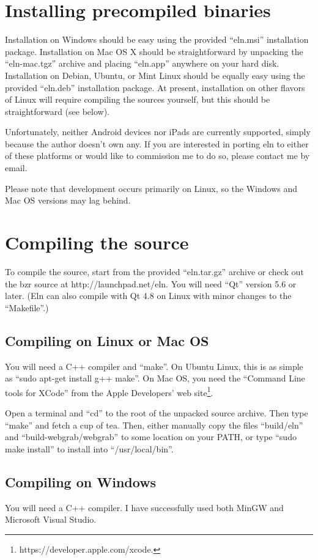 \documentclass[11pt]{report}
\begin{document}
\section{Installing precompiled binaries}

Installation on Windows should be easy using the provided ``eln.msi''
installation package. Installation on Mac OS X should be
straightforward by unpacking the ``eln-mac.tgz'' archive and placing
``eln.app'' anywhere on your hard disk.  Installation on Debian,
Ubuntu, or Mint Linux should be equally easy using the provided
``eln.deb'' installation package. At present, installation on other
flavors of Linux will require compiling the sources yourself, but this
should be straightforward (see below).

Unfortunately, neither Android devices nor iPads are currently
supported, simply because the author doesn't own any. If you are
interested in porting eln to either of these platforms or would like
to commission me to do so, please contact me by email.

Please note that development occurs
primarily on Linux, so the Windows and Mac OS versions may lag
behind.

\section{Compiling the source}
To compile the source,  start from the provided
``eln.tar.gz'' archive or check out the bzr source at http://launchpad.net/eln. You will need
``Qt'' version 5.6 or later. (Eln can also compile with Qt 4.8 on
Linux with minor changes to the ``Makefile''.)

\subsection{Compiling on Linux or Mac OS}

You will need a C++ compiler and ``make''. On Ubuntu Linux, this is as simple
as ``sudo apt-get install g++ make''. On Mac OS, you need the
``Command Line tools for XCode'' from the Apple Developers' web
site\footnote{https://developer.apple.com/xcode.}.

Open a terminal and ``cd'' to the root of the unpacked source
archive. Then type ``make'' and fetch a cup of tea. Then, either
manually copy the files ``build/eln'' and
``build-webgrab/webgrab'' to some location on your PATH, or type ``sudo make
install'' to install into ``/usr/local/bin''.

\subsection{Compiling on Windows}
You will need a C++ compiler. I have successfully used both MinGW and
Microsoft Visual Studio.
\end{document}
